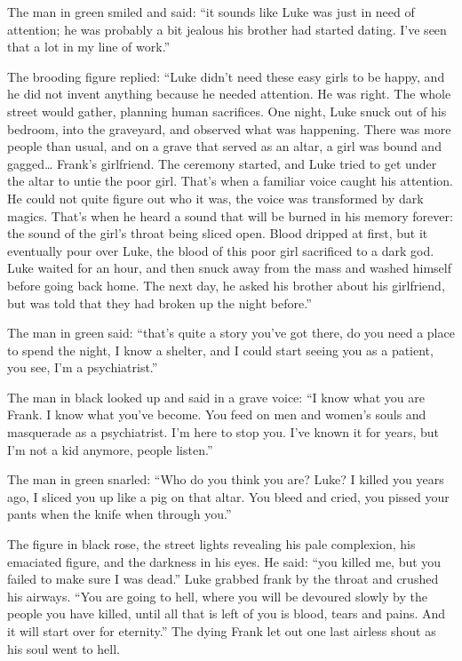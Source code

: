 The man in green smiled and said: ``it sounds like Luke was
just in need of attention; he was probably a bit jealous his
brother had started dating. I've seen that a lot in my line
of work.''

The brooding figure replied: ``Luke didn't need these
easy girls to be happy, and he did not invent anything because he
needed attention. He was right. The whole street would gather,
planning human sacrifices. One night, Luke snuck out of his
bedroom, into the graveyard, and observed what was happening. There
was more people than usual, and on a grave that served as an altar,
a girl was bound and gagged{\ldots} Frank's girlfriend. The
ceremony started, and Luke tried to get under the altar to untie
the poor girl. That's when a familiar voice caught his
attention. He could not quite figure out who it was, the voice was
transformed by dark magics. That's when he heard a sound that
will be burned in his memory forever: the sound of the girl's
throat being sliced open. Blood dripped at first, but it eventually
pour over Luke, the blood of this poor girl sacrificed to a dark
god. Luke waited for an hour, and then snuck away from the mass and
washed himself before going back home. The next day, he asked his
brother about his girlfriend, but was told that they had broken up
the night before.''

The man in green said: ``that's quite a story
you've got there, do you need a place to spend the night, I
know a shelter, and I could start seeing you as a patient, you see,
I'm a psychiatrist.''

The man in black looked up and said in a grave voice: ``I know
what you are Frank. I know what you've become. You feed on
men and women's souls and masquerade as a psychiatrist.
I'm here to stop you. I've known it for years, but
I'm not a kid anymore, people listen.''

The man in green snarled: ``Who do you think you are? Luke? I
killed you years ago, I sliced you up like a pig on that altar. You
bleed and cried, you pissed your pants when the knife when through
you.''

The figure in black rose, the street lights revealing his pale
complexion, his emaciated figure, and the darkness in his eyes. He
said: ``you killed me, but you failed to make sure I was
dead.'' Luke grabbed frank by the throat and crushed his
airways. ``You are going to hell, where you will be devoured
slowly by the people you have killed, until all that is left of you
is blood, tears and pains. And it will start over for
eternity.'' The dying Frank let out one last airless shout as
his soul went to hell.

